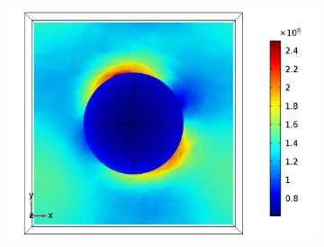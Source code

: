 \begin{figure}[htb!]
\begin{subfigure}{0.32\textwidth}
        \centering
        \includegraphics[width=\linewidth]{figures/ch4/S5A/FieldDistribution/phi25/z2/Sample5A_TE_Slice@z=+05Rz_wl=300_phi=25.png}
   \end{subfigure}


\end{figure}
